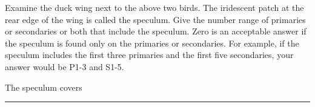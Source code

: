 \documentclass[10pt]{article}
\begin{document}
\vspace{2\baselineskip}

Examine the duck wing next to the above two birds. The iridescent patch at the rear edge of the wing is called the speculum.  Give the number range of primaries or secondaries or both that include the speculum.  Zero is an acceptable answer if the speculum is found only on the primaries or secondaries. For example, if the speculum includes the first three primaries and the first five secondaries, your answer would be P1-3 and S1-5.

\vspace{2\baselineskip}

The speculum covers \rule{3in}{0.4pt}
\end{document}
